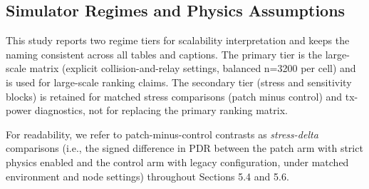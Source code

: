 ﻿\documentclass[sensors,article,submit,moreauthors,pdftex]{Definitions/mdpi}
\begin{document}
\subsection{Simulator Regimes and Physics Assumptions}
This study reports two regime tiers for scalability interpretation and keeps the naming consistent across all tables and captions. The primary tier is the large-scale matrix (explicit collision-and-relay settings, balanced n=3200 per cell) and is used for large-scale ranking claims. The secondary tier (stress and sensitivity blocks) is retained for matched stress comparisons (patch minus control) and tx-power diagnostics, not for replacing the primary ranking matrix.

For readability, we refer to patch-minus-control contrasts as \emph{stress-delta} comparisons (i.e., the signed difference in PDR between the patch arm with strict physics enabled and the control arm with legacy configuration, under matched environment and node settings) throughout Sections 5.4 and 5.6.

\begin{table}[H]
\caption{Evidence-regime map used in this manuscript.}
\label{tab:regime_map}
\centering
{}
\end{table}
\end{document}
